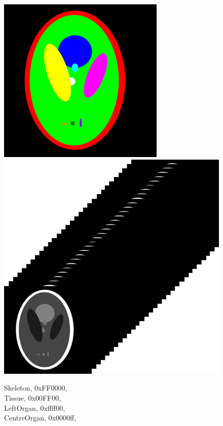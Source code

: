 \documentclass[12pt,twoside,notitlepage]{report}
\begin{document}
        \begin{figure}
            \centering
            \includegraphics[scale=0.8]{example_pixel_label_shepp_logan} 
            \ \ \ 
            \includegraphics[scale=0.33]{example_spectral_image_shepp_logan}
            \begin{framed}
                {\tt\raggedright
                    Skeleton, 0xFF0000,     \\
                    Tissue, 0x00FF00,       \\
                    LeftOrgan, 0xffff00,    \\  
                    CentreOrgan, 0x0000ff,  \\
}
\end{framed}
\end{figure}
\end{document}
